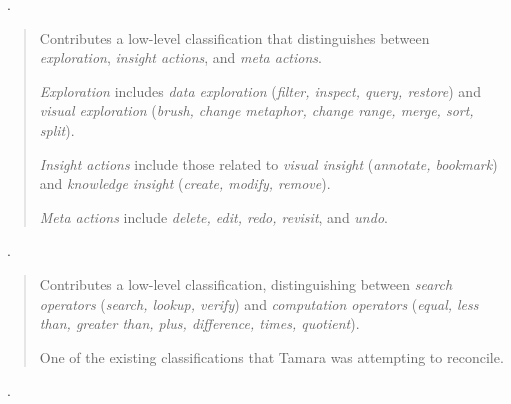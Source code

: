 \begin{sloppypar}
~\cite{Gotz2008}. \end{sloppypar}

\begin{quotation}
    Contributes a low-level classification that distinguishes between {\it exploration}, {\it insight actions}, and {\it meta actions}.
    
    {\it Exploration} includes {\it data exploration} ({\it filter, inspect, query, restore}) and {\it visual exploration} ({\it brush, change metaphor, change range, merge, sort, split}).
    
    {\it Insight actions} include those related to {\it visual insight} ({\it annotate, bookmark}) and {\it knowledge insight} ({\it create, modify, remove}).
    
    {\it Meta actions} include {\it delete, edit, redo, revisit}, and {\it undo}.
\end{quotation}

\begin{sloppypar}
~\cite{Casner1991}. \end{sloppypar}

\begin{quotation}
    Contributes a low-level classification, distinguishing between {\it search operators} ({\it search, lookup, verify}) and {\it computation operators} ({\it equal, less than, greater than, plus, difference, times, quotient}).
    
    One of the existing classifications that Tamara was attempting to reconcile.
\end{quotation}

\begin{sloppypar}
~\cite{Mullins1993}. \end{sloppypar}

